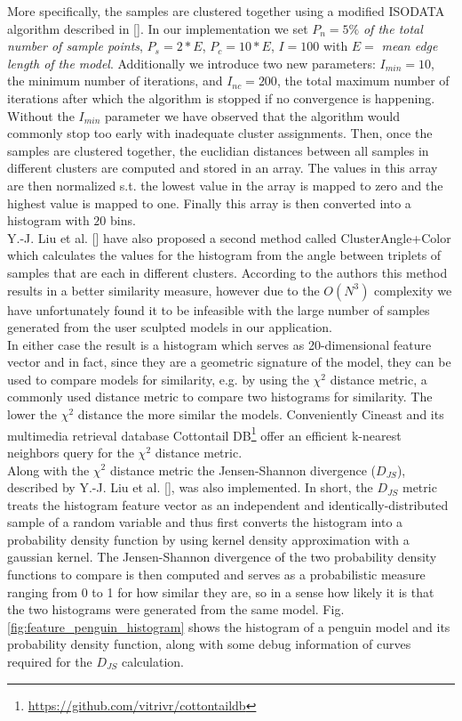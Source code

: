 More specifically, the samples are clustered together using a modified
ISODATA algorithm described in []. In our implementation we set $P_n = 5\%$ \textit{of the total number of sample points}, $P_s = 2 * E$, $P_c = 10 * E$, $I = 100$ with $E =$ \textit{mean edge length of the model}.
Additionally we introduce two new parameters: $I_{min} = 10$, the minimum number of iterations, and $I_{nc} = 200$, the total maximum number of iterations after which the algorithm is stopped if no convergence is happening. Without
the $I_{min}$ parameter we have observed that the algorithm would commonly stop too early with inadequate cluster assignments. Then, once the samples are clustered together, the euclidian distances between all samples in different clusters
are computed and stored in an array. The values in this array are then normalized s.t. the lowest value in the array is mapped to zero and the highest value is mapped to one. Finally this array is then converted into a histogram with $20$
bins.\\
Y.-J. Liu et al. [] have also proposed a second method called ClusterAngle+Color which calculates the values for the histogram from the angle between triplets of samples that are each in different clusters. According
to the authors this method results in a better similarity measure, however due to the $O(N^3)$ complexity we have unfortunately found it to be infeasible with the large number of samples generated from the user sculpted models in our application.\\
In either case the result is a histogram which serves as 20-dimensional feature vector and in fact, since they are a geometric signature of the model, they can be used to compare models for similarity,
e.g. by using the $\chi^2$ distance metric, a commonly used distance metric to compare two histograms for similarity. The lower the $\chi^2$ distance the more similar the models. Conveniently Cineast and its multimedia retrieval
database Cottontail DB\footnote{\url{https://github.com/vitrivr/cottontaildb}} offer an efficient k-nearest neighbors query for the $\chi^2$ distance metric.\\
Along with the $\chi^2$ distance metric the Jensen-Shannon divergence ($D_{JS}$), described by Y.-J. Liu et al. [], was also implemented. In short, the $D_{JS}$ metric treats the histogram feature vector as an independent and identically-distributed sample of a random variable and thus first converts the histogram into a probability density function by using kernel density approximation with a gaussian kernel. The Jensen-Shannon divergence of the two probability density functions to compare is then computed and serves as a probabilistic measure ranging from 0 to 1 for how similar they are, so in a sense how likely it is that the two histograms were generated from the same model. Fig. \ref{fig:feature_penguin_histogram} shows the histogram of a penguin model and its probability density function, along with some debug information of curves required for the $D_{JS}$ calculation.


